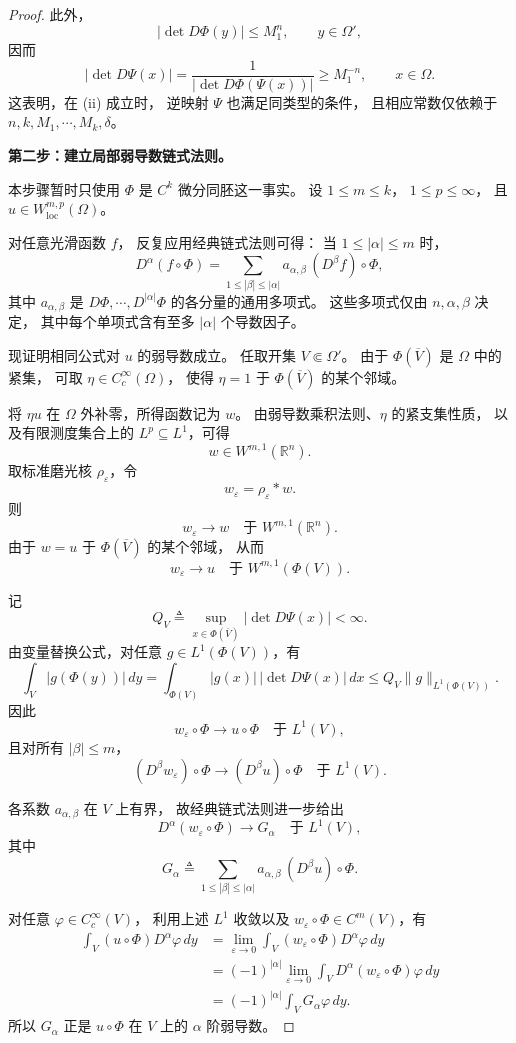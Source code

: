 \documentclass[../../main.tex]{subfiles}%
\begin{document}
\begin{proof}
此外，
\[
|\det D\Phi(y)|\leqslant M_1^n,
\qquad y\in\Omega',
\]
因而
\[
|\det D\Psi(x)|
=
\frac{1}{|\det D\Phi(\Psi(x))|}
\geqslant M_1^{-n},
\qquad x\in\Omega.
\]
这表明，在 \textup{(ii)} 成立时，
逆映射 $\Psi$ 也满足同类型的条件，
且相应常数仅依赖于
$n,k,M_1,\cdots,M_k,\delta$。

\medskip
\noindent
\textbf{第二步：建立局部弱导数链式法则。}

本步骤暂时只使用 $\Phi$ 是 $C^k$ 微分同胚这一事实。
设 $1\leqslant m\leqslant k$，
$1\leqslant p\leqslant\infty$，
且 $u\in W^{m,p}_{\mathrm{loc}}(\Omega)$。

对任意光滑函数 $f$，
反复应用经典链式法则可得：
当 $1\leqslant|\alpha|\leqslant m$ 时，
\[
D^\alpha(f\circ\Phi)
=
\sum_{1\leqslant|\beta|\leqslant|\alpha|}
a_{\alpha,\beta}\,(D^\beta f)\circ\Phi,
\]
其中 $a_{\alpha,\beta}$ 是
$D\Phi,\cdots,D^{|\alpha|}\Phi$
的各分量的通用多项式。
这些多项式仅由 $n,\alpha,\beta$ 决定，
其中每个单项式含有至多 $|\alpha|$ 个导数因子。

现证明相同公式对 $u$ 的弱导数成立。
任取开集 $V\Subset\Omega'$。
由于 $\Phi(\overline V)$ 是 $\Omega$ 中的紧集，
可取 $\eta\in C_c^\infty(\Omega)$，
使得 $\eta=1$ 于 $\Phi(\overline V)$ 的某个邻域。

将 $\eta u$ 在 $\Omega$ 外补零，所得函数记为 $w$。
由弱导数乘积法则、$\eta$ 的紧支集性质，
以及有限测度集合上的
$L^p\subseteq L^1$，可得
\[
w\in W^{m,1}(\mathbb{R}^n).
\]
取标准磨光核 $\rho_\varepsilon$，令
\[
w_\varepsilon=\rho_\varepsilon*w.
\]
则
\[
w_\varepsilon\longrightarrow w
\quad\text{于 }W^{m,1}(\mathbb{R}^n).
\]
由于 $w=u$ 于 $\Phi(\overline V)$ 的某个邻域，
从而
\[
w_\varepsilon\longrightarrow u
\quad\text{于 }W^{m,1}(\Phi(V)).
\]

记
\[
Q_V\triangleq
\sup_{x\in\Phi(\overline V)}|\det D\Psi(x)|<\infty.
\]
由变量替换公式，对任意 $g\in L^1(\Phi(V))$，有
\[
\int_V|g(\Phi(y))|\,dy
=
\int_{\Phi(V)}|g(x)|\,|\det D\Psi(x)|\,dx
\leqslant
Q_V\|g\|_{L^1(\Phi(V))}.
\]
因此
\[
w_\varepsilon\circ\Phi
\longrightarrow u\circ\Phi
\quad\text{于 }L^1(V),
\]
且对所有 $|\beta|\leqslant m$，
\[
(D^\beta w_\varepsilon)\circ\Phi
\longrightarrow (D^\beta u)\circ\Phi
\quad\text{于 }L^1(V).
\]

各系数 $a_{\alpha,\beta}$ 在 $V$ 上有界，
故经典链式法则进一步给出
\[
D^\alpha(w_\varepsilon\circ\Phi)
\longrightarrow
G_\alpha
\quad\text{于 }L^1(V),
\]
其中
\[
G_\alpha
\triangleq
\sum_{1\leqslant|\beta|\leqslant|\alpha|}
a_{\alpha,\beta}\,(D^\beta u)\circ\Phi.
\]

对任意 $\varphi\in C_c^\infty(V)$，
利用上述 $L^1$ 收敛以及
$w_\varepsilon\circ\Phi\in C^m(V)$，有
\begin{align*}
\int_V(u\circ\Phi)D^\alpha\varphi\,dy
&=
\lim_{\varepsilon\to0}
\int_V(w_\varepsilon\circ\Phi)D^\alpha\varphi\,dy\\
&=
(-1)^{|\alpha|}
\lim_{\varepsilon\to0}
\int_VD^\alpha(w_\varepsilon\circ\Phi)\varphi\,dy\\
&=
(-1)^{|\alpha|}\int_VG_\alpha\varphi\,dy.
\end{align*}
所以 $G_\alpha$ 正是 $u\circ\Phi$ 在 $V$ 上的
$\alpha$ 阶弱导数。


\end{proof}
\end{document}
